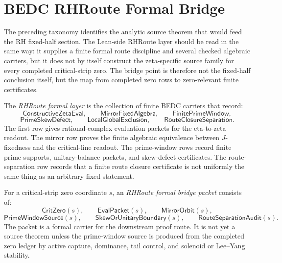 \section{BEDC RHRoute Formal Bridge}
\label{sec:unified-reality-bedc-rhroute-formal-bridge}

The preceding taxonomy identifies the analytic source theorem that would
feed the RH fixed-half section.  The Lean-side RHRoute layer should be
read in the same way: it supplies a finite formal route discipline and
several checked algebraic carriers, but it does not by itself construct
the zeta-specific source family for every completed critical-strip zero.
The bridge point is therefore not the fixed-half conclusion itself, but
the map from completed zero rows to zero-relevant finite certificates.

\begin{definition}
\label{def:unified-reality-rhroute-formal-layer}
The \emph{RHRoute formal layer} is the collection of finite BEDC
carriers that record:
$$
\mathsf{ConstructiveZetaEval},
\qquad
\mathsf{MirrorFixedAlgebra},
\qquad
\mathsf{FinitePrimeWindow},
$$
$$
\mathsf{PrimeSkewDefect},
\qquad
\mathsf{LocalGlobalExclusion},
\qquad
\mathsf{RouteClosureSeparation}.
$$
The first row gives rational-complex evaluation packets for the
eta-to-zeta readout.  The mirror row proves the finite algebraic
equivalence between $J$-fixedness and the critical-line readout.  The
prime-window rows record finite prime supports, unitary-balance packets,
and skew-defect certificates.  The route-separation row records that a
finite route closure certificate is not uniformly the same thing as an
arbitrary fixed statement.
\end{definition}

\begin{definition}
\label{def:unified-reality-rhroute-formal-bridge-packet}
For a critical-strip zero coordinate $s$, an \emph{RHRoute formal bridge
packet} consists of:
$$
\mathsf{CritZero}(s),
\qquad
\mathsf{EvalPacket}(s),
\qquad
\mathsf{MirrorOrbit}(s),
$$
$$
\mathsf{PrimeWindowSource}(s),
\qquad
\mathsf{SkewOrUnitaryBoundary}(s),
\qquad
\mathsf{RouteSeparationAudit}(s).
$$
The packet is a formal carrier for the downstream proof route.  It is
not yet a source theorem unless the prime-window source is produced from
the completed zero ledger by active capture, dominance, tail control,
and solenoid or Lee--Yang stability.
\end{definition}

